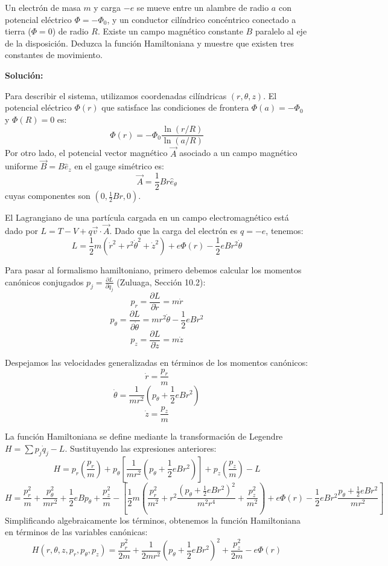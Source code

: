 \documentclass[a4paper]{article}
\begin{document}
Un electrón de masa $m$ y carga $-e$ se mueve entre un alambre de radio $a$ con potencial eléctrico $\Phi = -\Phi_0$, y un conductor cilíndrico concéntrico conectado a tierra ($\Phi = 0$) de radio $R$. Existe un campo magnético constante $B$ paralelo al eje de la disposición. Deduzca la función Hamiltoniana y muestre que existen tres constantes de movimiento.


\textbf{Solución:}

Para describir el sistema, utilizamos coordenadas cilíndricas $(r, \theta, z)$. El potencial eléctrico $\Phi(r)$ que satisface las condiciones de frontera $\Phi(a) = -\Phi_0$ y $\Phi(R) = 0$ es:
$$ \Phi(r) = -\Phi_0 \frac{\ln(r/R)}{\ln(a/R)} $$
Por otro lado, el potencial vector magnético $\vec{A}$ asociado a un campo magnético uniforme $\vec{B} = B\hat{e}_z$ en el gauge simétrico es:
$$ \vec{A} = \frac{1}{2}Br\hat{e}_\theta $$
cuyas componentes son $(0, \frac{1}{2}Br, 0)$.

El Lagrangiano de una partícula cargada en un campo electromagnético está dado por $L = T - V + q\vec{v}\cdot\vec{A}$. Dado que la carga del electrón es $q = -e$, tenemos:
$$ L = \frac{1}{2}m(\dot{r}^2 + r^2\dot{\theta}^2 + \dot{z}^2) + e\Phi(r) - \frac{1}{2}eBr^2\dot{\theta} $$

Para pasar al formalismo hamiltoniano, primero debemos calcular los momentos canónicos conjugados $p_j = \frac{\partial L}{\partial \dot{q}_j}$ (Zuluaga, Sección 10.2):
$$ p_r = \frac{\partial L}{\partial \dot{r}} = m\dot{r} $$
$$ p_\theta = \frac{\partial L}{\partial \dot{\theta}} = mr^2\dot{\theta} - \frac{1}{2}eBr^2 $$
$$ p_z = \frac{\partial L}{\partial \dot{z}} = m\dot{z} $$

Despejamos las velocidades generalizadas en términos de los momentos canónicos:
$$ \dot{r} = \frac{p_r}{m} $$
$$ \dot{\theta} = \frac{1}{mr^2}\left(p_\theta + \frac{1}{2}eBr^2\right) $$
$$ \dot{z} = \frac{p_z}{m} $$

La función Hamiltoniana se define mediante la transformación de Legendre $H = \sum p_j \dot{q}_j - L$. Sustituyendo las expresiones anteriores:
$$ H = p_r\left(\frac{p_r}{m}\right) + p_\theta\left[\frac{1}{mr^2}\left(p_\theta + \frac{1}{2}eBr^2\right)\right] + p_z\left(\frac{p_z}{m}\right) - L $$
$$ H = \frac{p_r^2}{m} + \frac{p_\theta^2}{mr^2} + \frac{1}{2}eBp_\theta + \frac{p_z^2}{m} - \left[ \frac{1}{2}m\left(\frac{p_r^2}{m^2} + r^2\frac{(p_\theta + \frac{1}{2}eBr^2)^2}{m^2r^4} + \frac{p_z^2}{m^2}\right) + e\Phi(r) - \frac{1}{2}eBr^2\frac{p_\theta + \frac{1}{2}eBr^2}{mr^2} \right] $$
Simplificando algebraicamente los términos, obtenemos la función Hamiltoniana en términos de las variables canónicas:
$$ H(r, \theta, z, p_r, p_\theta, p_z) = \frac{p_r^2}{2m} + \frac{1}{2mr^2}\left(p_\theta + \frac{1}{2}eBr^2\right)^2 + \frac{p_z^2}{2m} - e\Phi(r) $$
\end{document}
